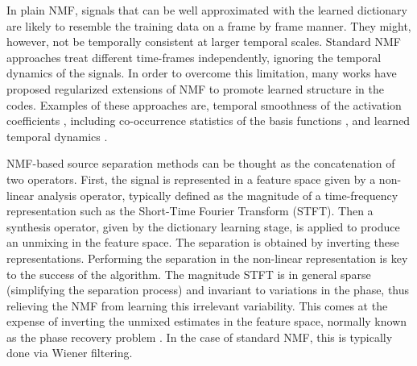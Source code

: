 In plain NMF, signals that can be well approximated with the learned dictionary are
likely to resemble the training data on a frame by frame manner. They might, however, 
not be temporally consistent at larger temporal scales.
 Standard NMF approaches treat different time-frames independently, ignoring the 
temporal dynamics of the signals. 
In order to overcome this limitation,  
many works have proposed regularized extensions of NMF to promote learned structure in the codes. 
Examples of these approaches are, temporal smoothness of the activation coefficients \cite{fevotte2011majorization}, including  co-occurrence statistics of the basis functions \cite{WilsonRSD08}, and learned temporal dynamics \cite{MysoreS11,HanMP12,icassp13a}.

NMF-based source separation methods can be thought as the concatenation of two operators.
First, the signal is represented in a feature space given by a non-linear analysis operator, 
typically defined as the magnitude of a time-frequency representation such
as the Short-Time Fourier Transform (STFT). 
Then a synthesis operator, given by the dictionary learning stage, is applied to produce an unmixing in the feature space.
 The separation is obtained by inverting these representations. 
Performing the separation in the non-linear representation is key to the success of the algorithm. The magnitude STFT is in general sparse (simplifying the separation process) and invariant to variations in the phase, thus relieving the NMF from
learning this irrelevant variability. 
This comes at the expense of inverting the unmixed estimates in the feature space, normally known as the
phase recovery problem \cite{yonina}. In the case of standard NMF, this is 
typically done via Wiener filtering. 

